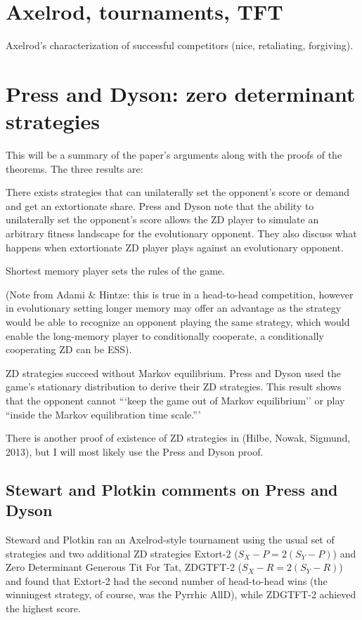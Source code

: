 \section{Axelrod, tournaments, TFT}
Axelrod's characterization of successful competitors (nice, retaliating, forgiving).

\section{Press and Dyson: zero determinant strategies}
This will be a summary of the paper's arguments along with the proofs of the theorems. The three results are:

\begin{theorem}
There exists strategies that can unilaterally set the opponent's score or demand and get an extortionate share. Press and Dyson note that the ability to unilaterally set the opponent's score allows the ZD player to simulate an arbitrary fitness landscape for the evolutionary opponent. They also discuss what happens when extortionate ZD player plays against an evolutionary opponent. 
\end{theorem}
\begin{theorem}
Shortest memory player sets the rules of the game.

(Note from Adami \& Hintze: this is true in a head-to-head competition, however in evolutionary setting longer memory may offer an advantage as the strategy would be able to recognize an opponent playing the same strategy, which would enable the long-memory player to conditionally cooperate, a conditionally cooperating ZD can be ESS).
\end{theorem}
\begin{theorem}
ZD strategies succeed without Markov equilibrium. Press and Dyson used the game's stationary distribution to derive their ZD strategies. This result shows that the opponent cannot  ```keep the game out of Markov equilibrium'' or play ``inside the Markov equilibration time scale.'''
\end{theorem}


There is another proof of existence of ZD strategies in (Hilbe, Nowak, Sigmund, 2013), but I will most likely use the Press and Dyson proof.

\subsection{Stewart and Plotkin comments on Press and Dyson}
Steward and Plotkin ran an Axelrod-style tournament using the usual set of strategies and two additional ZD strategies Extort-2 ($S_X - P = 2(S_Y - P)$) and Zero Determinant Generous Tit For Tat, ZDGTFT-2 ($S_X - R = 2(S_Y - R)$) and found that Extort-2 had the second number of head-to-head wins (the winningest strategy, of course, was the Pyrrhic AllD), while ZDGTFT-2 achieved the highest score.


